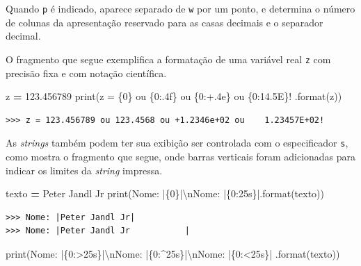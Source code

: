 \documentclass[
]{book}
\newenvironment{Shaded}{\begin{snugshade}}{\end{snugshade}}
\newcommand{\BuiltInTok}[1]{#1}
\newcommand{\CharTok}[1]{\textcolor[rgb]{0.31,0.60,0.02}{#1}}
\newcommand{\FloatTok}[1]{\textcolor[rgb]{0.00,0.00,0.81}{#1}}
\newcommand{\NormalTok}[1]{#1}
\newcommand{\OperatorTok}[1]{\textcolor[rgb]{0.81,0.36,0.00}{\textbf{#1}}}
\newcommand{\SpecialCharTok}[1]{\textcolor[rgb]{0.00,0.00,0.00}{#1}}
\newcommand{\StringTok}[1]{\textcolor[rgb]{0.31,0.60,0.02}{#1}}
\begin{document}
Quando \texttt{p} é indicado, aparece separado de \texttt{w} por um ponto, e determina o número de colunas da apresentação reservado para as casas decimais e o separador decimal.

O fragmento que segue exemplifica a formatação de uma variável real \texttt{z} com precisão fixa e com notação científica.

\begin{Shaded}
\begin{Highlighting}[]
\NormalTok{z }\OperatorTok{=} \FloatTok{123.456789}
\BuiltInTok{print}\NormalTok{(}\StringTok{\textquotesingle{}z = }\SpecialCharTok{\{0\}}\StringTok{ ou }\SpecialCharTok{\{0:.4f\}}\StringTok{ ou }\SpecialCharTok{\{0:+.4e\}}\StringTok{ ou }\SpecialCharTok{\{0:14.5E\}}\StringTok{!\textquotesingle{}}
\NormalTok{  .}\BuiltInTok{format}\NormalTok{(z))}
\end{Highlighting}
\end{Shaded}

\begin{verbatim}
>>> z = 123.456789 ou 123.4568 ou +1.2346e+02 ou    1.23457E+02!
\end{verbatim}

As \emph{strings} também podem ter sua exibição ser controlada com o especificador \texttt{s}, como mostra o fragmento que segue, onde barras verticais foram adicionadas para indicar os limites da \emph{string} impressa.

\begin{Shaded}
\begin{Highlighting}[]
\NormalTok{texto }\OperatorTok{=} \StringTok{\textquotesingle{}Peter Jandl Jr\textquotesingle{}}
\BuiltInTok{print}\NormalTok{(}\StringTok{\textquotesingle{}Nome: |}\SpecialCharTok{\{0\}}\StringTok{|}\CharTok{\textbackslash{}n}\StringTok{Nome: |}\SpecialCharTok{\{0:25s\}}\StringTok{|\textquotesingle{}}\NormalTok{.}\BuiltInTok{format}\NormalTok{(texto))}
\end{Highlighting}
\end{Shaded}

\begin{verbatim}
>>> Nome: |Peter Jandl Jr|
>>> Nome: |Peter Jandl Jr           |
\end{verbatim}

\begin{Shaded}
\begin{Highlighting}[]
\BuiltInTok{print}\NormalTok{(}\StringTok{\textquotesingle{}Nome: |}\SpecialCharTok{\{0:\textgreater{}25s\}}\StringTok{|}\CharTok{\textbackslash{}n}\StringTok{Nome: |}\SpecialCharTok{\{0:\^{}25s\}}\StringTok{|}\CharTok{\textbackslash{}n}\StringTok{Nome: |}\SpecialCharTok{\{0:\textless{}25s\}}\StringTok{|\textquotesingle{}}
\NormalTok{    .}\BuiltInTok{format}\NormalTok{(texto))}
\end{Highlighting}
\end{Shaded}
\end{document}
